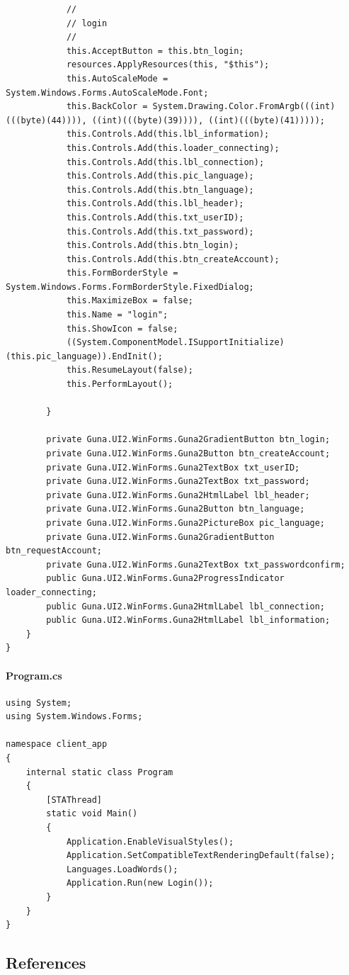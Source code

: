 \documentclass{article}
\begin{document}
\begin{verbatim}
			// 
			// login
			// 
			this.AcceptButton = this.btn_login;
			resources.ApplyResources(this, "$this");
			this.AutoScaleMode = System.Windows.Forms.AutoScaleMode.Font;
			this.BackColor = System.Drawing.Color.FromArgb(((int)(((byte)(44)))), ((int)(((byte)(39)))), ((int)(((byte)(41)))));
			this.Controls.Add(this.lbl_information);
			this.Controls.Add(this.loader_connecting);
			this.Controls.Add(this.lbl_connection);
			this.Controls.Add(this.pic_language);
			this.Controls.Add(this.btn_language);
			this.Controls.Add(this.lbl_header);
			this.Controls.Add(this.txt_userID);
			this.Controls.Add(this.txt_password);
			this.Controls.Add(this.btn_login);
			this.Controls.Add(this.btn_createAccount);
			this.FormBorderStyle = System.Windows.Forms.FormBorderStyle.FixedDialog;
			this.MaximizeBox = false;
			this.Name = "login";
			this.ShowIcon = false;
			((System.ComponentModel.ISupportInitialize)(this.pic_language)).EndInit();
			this.ResumeLayout(false);
			this.PerformLayout();

        }

        private Guna.UI2.WinForms.Guna2GradientButton btn_login;
        private Guna.UI2.WinForms.Guna2Button btn_createAccount;
		private Guna.UI2.WinForms.Guna2TextBox txt_userID;
		private Guna.UI2.WinForms.Guna2TextBox txt_password;
		private Guna.UI2.WinForms.Guna2HtmlLabel lbl_header;
		private Guna.UI2.WinForms.Guna2Button btn_language;
		private Guna.UI2.WinForms.Guna2PictureBox pic_language;
		private Guna.UI2.WinForms.Guna2GradientButton btn_requestAccount;
		private Guna.UI2.WinForms.Guna2TextBox txt_passwordconfirm;
		public Guna.UI2.WinForms.Guna2ProgressIndicator loader_connecting;
		public Guna.UI2.WinForms.Guna2HtmlLabel lbl_connection;
		public Guna.UI2.WinForms.Guna2HtmlLabel lbl_information;
	}
}
\end{verbatim}
\paragraph{Program.cs}\label{client/program.cs}
\begin{verbatim}
using System;
using System.Windows.Forms;

namespace client_app
{
	internal static class Program
	{
		[STAThread]
		static void Main()
		{
			Application.EnableVisualStyles();
			Application.SetCompatibleTextRenderingDefault(false);
			Languages.LoadWords();
			Application.Run(new Login());
		}
	}
}
\end{verbatim}

\subsection{References}
\end{document}
